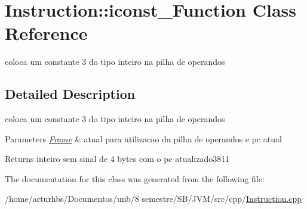 \hypertarget{classInstruction_1_1iconst__3Function}{}\section{Instruction\+:\+:iconst\+\_\+Function Class Reference}
\label{classInstruction_1_1iconst__3Function}


coloca um constante 3 do tipo inteiro na pilha de operandos  




\subsection{Detailed Description}
coloca um constante 3 do tipo inteiro na pilha de operandos 


\begin{DoxyParams}{Parameters}
{\em \hyperlink{classFrame}{Frame}} & atual para utilizacao da pilha de operandos e pc atual \\
\hline
\end{DoxyParams}
\begin{DoxyReturn}{Returns}
inteiro sem sinal de 4 bytes com o pc atualizado3811 
\end{DoxyReturn}


The documentation for this class was generated from the following file\+:\begin{DoxyCompactItemize}
\item 
/home/arturhbs/\+Documentos/unb/8 semestre/\+S\+B/\+J\+V\+M/src/cpp/\hyperlink{Instruction_8cpp}{Instruction.\+cpp}\end{DoxyCompactItemize}
